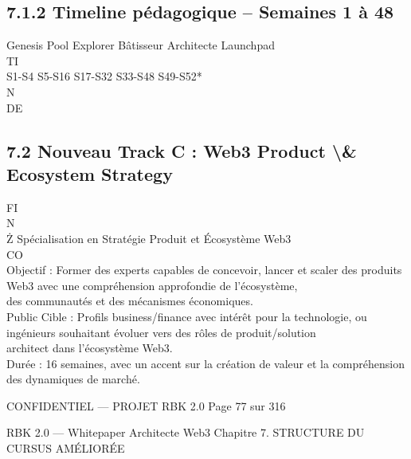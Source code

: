 \subsection{7.1.2 Timeline pédagogique – Semaines 1 à 48}
\vspace{0.5em}
Genesis Pool        Explorer          Bâtisseur         Architecte         Launchpad\\
\vspace{0.5em}
\vspace{0.5em}
\vspace{0.5em}
\vspace{0.5em}
TI\\
S1-S4             S5-S16            S17-S32           S33-S48            S49-S52*\\
\vspace{0.5em}
\vspace{0.5em}
\vspace{0.5em}
\vspace{0.5em}
N\\
DE\\
\subsection{7.2 Nouveau Track C : Web3 Product \textbackslash{}& Ecosystem Strategy}
\vspace{0.5em}
\vspace{0.5em}
\vspace{0.5em}
FI\\
N\\
Ż Spécialisation en Stratégie Produit et Écosystème Web3\\
CO\\
Objectif : Former des experts capables de concevoir, lancer et scaler des produits Web3 avec une compréhension approfondie de l’écosystème,\\
des communautés et des mécanismes économiques.\\
Public Cible : Profils business/finance avec intérêt pour la technologie, ou ingénieurs souhaitant évoluer vers des rôles de produit/solution\\
architect dans l’écosystème Web3.\\
Durée : 16 semaines, avec un accent sur la création de valeur et la compréhension des dynamiques de marché.\\
\vspace{0.5em}
\vspace{0.5em}
\vspace{0.5em}
\vspace{0.5em}
\begin{confidential}CONFIDENTIEL — PROJET RBK 2.0                                   Page 77 sur 316\end{confidential}
RBK 2.0 — Whitepaper Architecte Web3                                                                    Chapitre 7. STRUCTURE DU CURSUS AMÉLIORÉE\\
\vspace{0.5em}
\vspace{0.5em}
